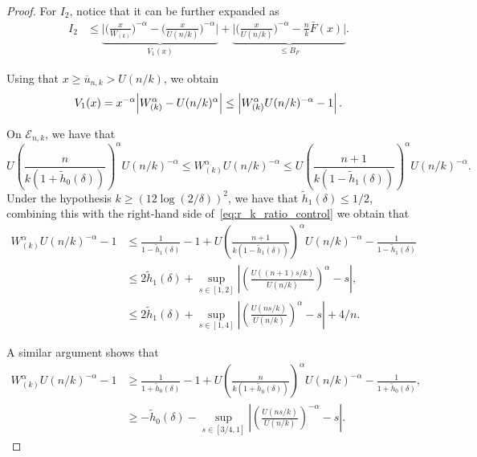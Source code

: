 \documentclass{article}
\numberwithin{equation}{section}
\begin{document}
\begin{proof}
    For \(I_2\), notice that it can be further expanded as
    \begin{align*}
        I_2 & \le \underbrace{\bigg|  \Big(\frac{x}{W_{(k)}} \Big)^{-\alpha} -
            \Big(\frac{x}{U(n/k)
        } \Big)^{-\alpha}  \bigg| }_{V_{1}(x)}+
        \underbrace{\bigg|  \Big(\frac{x}{U(n/k)} \Big)^{-\alpha} -
        \frac{n}{k}\bar{F}\left(x\right)\bigg|}_{\leq B_F}.
    \end{align*}

    Using that \(x\geq \overline{u}_{n,k} >
    U(n/k)\), we obtain
    \begin{equation*}
        V_{1}(x) = x^{-\alpha}\Bigl| W_{(k)}^\alpha -
        U(n/k)^{\alpha} \Bigr|\leq
        \left|W_{(k)}^{\alpha}U(n/k)^{-\alpha}-1\right|.
    \end{equation*}

    On \(\mathcal{E}_{n,k}\), we have that
    \begin{equation}\label{eq:r_k_ratio_control}
        U\left(\frac{n}{k(1+\tilde{h}_0(\delta))}\right)^{\alpha}U(n/k)^{-\alpha}\leq
        W_{(k)}^\alpha U(n/k)^{-\alpha}\leq
        U\left(\frac{n+1}{k(1-\tilde{h}_1(\delta))}\right)^{\alpha}U(n/k)^{-\alpha}.
    \end{equation}
    Under the hypothesis \(k\geq (12\log(2/\delta))^2\),
    we have that
    \(\tilde{h}_1(\delta)\leq 1/2\),
    combining this with the right-hand side
    of~\eqref{eq:r_k_ratio_control} we obtain that
    \begin{align*}
        W_{(k)}^\alpha U(n/k)^{-\alpha} -1 & \leq
        \frac{1}{1-\tilde{h}_1(\delta)} - 1 +
        U\left(\frac{n+1}{k(1-\tilde{h}_1(\delta))}\right)^{\alpha}U(n/k)^{-\alpha}
        - \frac{1}{1-\tilde{h}_1(\delta)}
        \\
        & \leq 2\tilde{h}_1(\delta) + \sup_{s\in[1,2]}{\left|
            \left(\frac{U\left((n+1)s/k\right)}{U(n/k)}\right)^{\alpha}
        -s\right|},
        \\
        & \leq 2\tilde{h}_1(\delta) +
        \sup_{s\in[1,4]}{\left|\left(\frac{U(ns/k)}{U(n/k)}\right)^{\alpha}-s\right|}+4/n.
    \end{align*}

    A similar argument shows that
    \begin{align*}
        W_{(k)}^\alpha U(n/k)^{-\alpha} -1 & \geq
        \frac{1}{1+\tilde{h}_0(\delta)} - 1 +
        U\left(\frac{n}{k(1+\tilde{h}_0(\delta))}\right)^{\alpha}U(n/k)^{-\alpha}
        - \frac{1}{1+\tilde{h}_0(\delta)},
        \\
        & \geq -\tilde{h}_0(\delta) -
        \sup_{s\in[3/4,1]}{\left|\left(\frac{U(ns/k)}{U(n/k)}\right)^{-\alpha}-s\right|}.
    \end{align*}


\end{proof}
\end{document}
